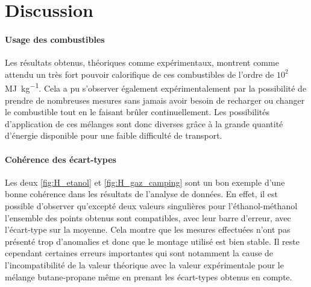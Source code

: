 \section{Discussion}

\paragraph*{Usage des combustibles}
Les résultats obtenus, théoriques comme expérimentaux, montrent comme attendu un très fort pouvoir calorifique de ces combustibles de l'ordre de \(10^2\) \si{\mega\joule\per\kilo\gram}. Cela a pu s'observer également expérimentalement par la possibilité de prendre de nombreuses mesures sans jamais avoir besoin de recharger ou changer le combustible tout en le faisant brûler continuellement. Les possibilités d'application de ces mélanges sont donc diverses grâce à la grande quantité d'énergie disponible pour une faible difficulté de transport.

\paragraph*{Cohérence des écart-types}
Les deux \autoref{fig:H_etanol} et \autoref{fig:H_gaz_camping} sont un bon exemple d'une bonne cohérence dans les résultats de l'analyse de données. En effet, il est possible d'observer qu'excepté deux valeurs singulières pour l'éthanol-méthanol l'ensemble des points obtenus sont compatibles, avec leur barre d'erreur, avec l'écart-type sur la moyenne. Cela montre que les mesures effectuées n'ont pas présenté trop d'anomalies et donc que le montage utilisé est bien stable. Il reste cependant certaines erreurs importantes qui sont notamment la cause de l'incompatibilité de la valeur théorique avec la valeur expérimentale pour le mélange butane-propane même en prenant les écart-types obtenus en compte. 


